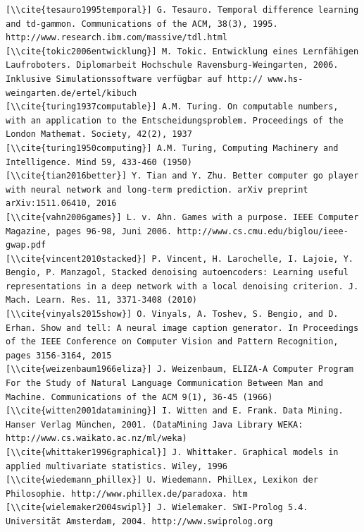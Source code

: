 \documentclass[10pt]{book}
\begin{document}
\begin{verbatim}
[\\cite{tesauro1995temporal}] G. Tesauro. Temporal difference learning and td-gammon. Communications of the ACM, 38(3), 1995. http://www.research.ibm.com/massive/tdl.html
[\\cite{tokic2006entwicklung}] M. Tokic. Entwicklung eines Lernfähigen Laufroboters. Diplomarbeit Hochschule Ravensburg-Weingarten, 2006. Inklusive Simulationssoftware verfügbar auf http:// www.hs-weingarten.de/ertel/kibuch
[\\cite{turing1937computable}] A.M. Turing. On computable numbers, with an application to the Entscheidungsproblem. Proceedings of the London Mathemat. Society, 42(2), 1937
[\\cite{turing1950computing}] A.M. Turing, Computing Machinery and Intelligence. Mind 59, 433-460 (1950)
[\\cite{tian2016better}] Y. Tian and Y. Zhu. Better computer go player with neural network and long-term prediction. arXiv preprint arXiv:1511.06410, 2016
[\\cite{vahn2006games}] L. v. Ahn. Games with a purpose. IEEE Computer Magazine, pages 96-98, Juni 2006. http://www.cs.cmu.edu/biglou/ieee-gwap.pdf
[\\cite{vincent2010stacked}] P. Vincent, H. Larochelle, I. Lajoie, Y. Bengio, P. Manzagol, Stacked denoising autoencoders: Learning useful representations in a deep network with a local denoising criterion. J. Mach. Learn. Res. 11, 3371-3408 (2010)
[\\cite{vinyals2015show}] O. Vinyals, A. Toshev, S. Bengio, and D. Erhan. Show and tell: A neural image caption generator. In Proceedings of the IEEE Conference on Computer Vision and Pattern Recognition, pages 3156-3164, 2015
[\\cite{weizenbaum1966eliza}] J. Weizenbaum, ELIZA-A Computer Program For the Study of Natural Language Communication Between Man and Machine. Communications of the ACM 9(1), 36-45 (1966)
[\\cite{witten2001datamining}] I. Witten and E. Frank. Data Mining. Hanser Verlag München, 2001. (DataMining Java Library WEKA: http://www.cs.waikato.ac.nz/ml/weka)
[\\cite{whittaker1996graphical}] J. Whittaker. Graphical models in applied multivariate statistics. Wiley, 1996
[\\cite{wiedemann_phillex}] U. Wiedemann. PhilLex, Lexikon der Philosophie. http://www.phillex.de/paradoxa. htm
[\\cite{wielemaker2004swipl}] J. Wielemaker. SWI-Prolog 5.4. Universität Amsterdam, 2004. http://www.swiprolog.org

\end{verbatim}
\end{document}
